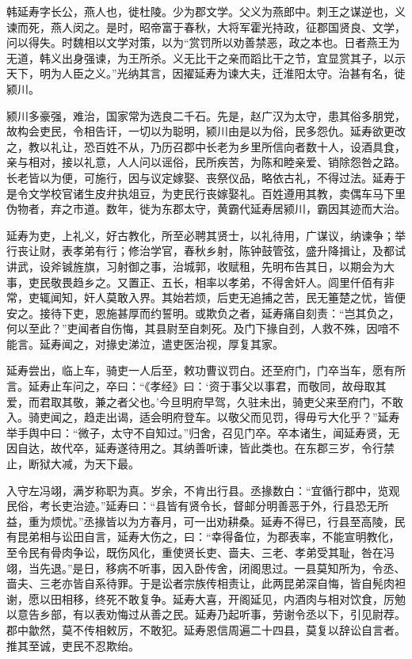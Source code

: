 \documentclass[12pt,UTF8]{ctexbook}
\begin{document}
韩延寿字长公，燕人也，徙杜陵。少为郡文学。父义为燕郎中。刺王之谋逆也，义谏而死，燕人闵之。是时，昭帝富于春秋，大将军霍光持政，征郡国贤良、文学，问以得失。时魏相以文学对策，以为“赏罚所以劝善禁恶，政之本也。日者燕王为无道，韩义出身强谏，为王所杀。义无比干之亲而蹈比干之节，宜显赏其子，以示天下，明为人臣之义。”光纳其言，因擢延寿为谏大夫，迁淮阳太守。治甚有名，徙颍川。



颍川多豪强，难治，国家常为选良二千石。先是，赵广汉为太守，患其俗多朋党，故构会吏民，令相告讦，一切以为聪明，颍川由是以为俗，民多怨仇。延寿欲更改之，教以礼让，恐百姓不从，乃历召郡中长老为乡里所信向者数十人，设酒具食，亲与相对，接以礼意，人人问以谣俗，民所疾苦，为陈和睦亲爱、销除怨咎之路。长老皆以为便，可施行，因与议定嫁娶、丧祭仪品，略依古礼，不得过法。延寿于是令文学校官诸生皮弁执俎豆，为吏民行丧嫁娶礼。百姓遵用其教，卖偶车马下里伪物者，弃之市道。数年，徙为东郡太守，黄霸代延寿居颍川，霸因其迹而大治。



延寿为吏，上礼义，好古教化，所至必聘其贤士，以礼待用，广谋议，纳谏争；举行丧让财，表孝弟有行；修治学官，春秋乡射，陈钟鼓管弦，盛升降揖让，及都试讲武，设斧铖旌旗，习射御之事，治城郭，收赋租，先明布告其日，以期会为大事，吏民敬畏趋乡之。又置正、五长，相率以孝弟，不得舍奸人。闾里仟佰有非常，吏辄闻知，奸人莫敢入界。其始若烦，后吏无追捕之苦，民无箠楚之忧，皆便安之。接待下吏，恩施甚厚而约誓明。或欺负之者，延寿痛自刻责：“岂其负之，何以至此？”吏闻者自伤悔，其县尉至自刺死。及门下掾自刭，人救不殊，因喑不能言。延寿闻之，对掾史涕泣，遣吏医治视，厚复其家。



延寿尝出，临上车，骑吏一人后至，敕功曹议罚白。还至府门，门卒当车，愿有所言。延寿止车问之，卒曰：“《孝经》曰：‘资于事父以事君，而敬同，故母取其爱，而君取其敬，兼之者父也。’今旦明府早驾，久驻未出，骑吏父来至府门，不敢入。骑吏闻之，趋走出谒，适会明府登车。以敬父而见罚，得毋亏大化乎？”延寿举手舆中曰：“微子，太守不自知过。”归舍，召见门卒。卒本诸生，闻延寿贤，无因自达，故代卒，延寿遂待用之。其纳善听谏，皆此类也。在东郡三岁，令行禁止，断狱大减，为天下最。



入守左冯翊，满岁称职为真。岁余，不肯出行县。丞掾数白：“宜循行郡中，览观民俗，考长吏治迹。”延寿曰：“县皆有贤令长，督邮分明善恶于外，行县恐无所益，重为烦忧。”丞掾皆以为方春月，可一出劝耕桑。延寿不得已，行县至高陵，民有昆弟相与讼田自言，延寿大伤之，曰：“幸得备位，为郡表率，不能宣明教化，至令民有骨肉争讼，既伤风化，重使贤长吏、啬夫、三老、孝弟受其耻，咎在冯翊，当先退。”是日，移病不听事，因入卧传舍，闭阁思过。一县莫知所为，令丞、啬夫、三老亦皆自系待罪。于是讼者宗族传相责让，此两昆弟深自悔，皆自髡肉袒谢，愿以田相移，终死不敢复争。延寿大喜，开阁延见，内酒肉与相对饮食，厉勉以意告乡部，有以表劝悔过从善之民。延寿乃起听事，劳谢令丞以下，引见尉荐。郡中歙然，莫不传相敕厉，不敢犯。延寿恩信周遍二十四县，莫复以辞讼自言者。推其至诚，吏民不忍欺绐。
\end{document}
